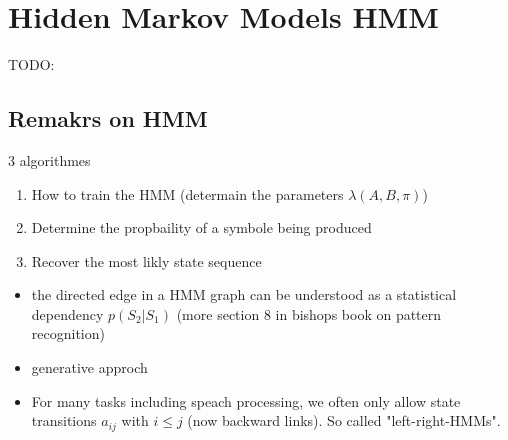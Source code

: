 
\section{Hidden Markov Models HMM}
TODO:

\subsection{Remakrs on HMM}

3 algorithmes
\begin{enumerate}
    \item  How to train the HMM (determain the parameters $\lambda (A, B, \pi)$)
    \item  Determine the propbaility of a symbole being produced
    \item  Recover the most likly state sequence
\end{enumerate}

\begin{itemize}
    \item the directed edge in a HMM graph can be understood as a statistical dependency $p(S_2|S_1)$ (more section 8 in bishops book on pattern recognition)
    \item generative approch
    \item For many tasks including speach processing, we often only allow state transitions $a_{ij}$ with $i \le j$ (now backward links). So called "left-right-HMMs".
\end{itemize}
